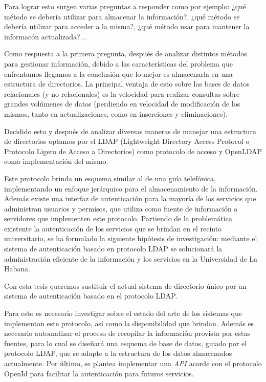 \begin{introduction}
Para lograr esto surgen varias preguntas a responder como por ejemplo: ¿qué método 
se debería utilizar para almacenar la información?, ¿qué método se debería utilizar 
para acceder a la misma?, ¿qué método usar para mantener la informacón actualizada?... 

Como respuesta a la primera pregunta, después de analizar distintos métodos para gestionar información, debido a las características del problema que enfrentamos llegamos a la conclusión que lo mejor es almacenarla en una estructura de directorios. La principal ventaja de esto sobre las bases de datos relacionales (y no relacionales) es la velocidad para realizar consultas sobre grandes volúmenes de datos (perdiendo en velocidad de modificación de los mismos, tanto en actualizaciones, como en inserciones y eliminaciones).

Decidido esto y después de analizar diversas maneras de manejar una estructura de directorios optamos por el LDAP (Lightweight Directory Access Protocol o Protocolo Ligero de Acceso a Directorios) como protocolo de acceso y OpenLDAP como implementación del mismo.

Este protocolo  brinda un esquema similar al de una guía telefónica, implementando un enfoque jerárquico para el almacenamiento de la información. Además existe una interfaz de autenticación para la mayoría de los servicios que administran usuarios y permisos, que utiliza como fuente de información a servidores que implementen este protocolo. 
Partiendo de la problemática existente la autenticación de los servicios que se brindan en el recinto universitario, se ha formulado la siguiente hipótesis de investigación: mediante el sistema de autenticación basado en protocolo LDAP se solucionará la administración eficiente de la información y los servicios en la Universidad de La Habana.

Con esta tesis queremos sustituir el actual sistema de directorio único por un sistema de autenticación basado en el protocolo LDAP.

Para esto es necesario investigar sobre el estado del arte de los sistemas que implementan este protocolo, así como la disponibilidad que brindan. Además es necesario automatizar el proceso de recopilar la información provista por estas fuentes, para lo cual se diseñará una esquema de base de datos, guiado por el protocolo LDAP, que se adapte a la estructura de los datos almacenados actualmente. Por último, se plantea implementar una \textit{API} acorde con el protocolo OpenId para facilitar la autenticación para futuros servicios.

\end{introduction} 